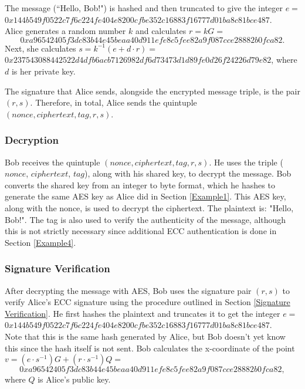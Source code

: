 \documentclass[12pt,a4paper]{article}
\begin{document}
The message (``Hello, Bob!") is hashed and then truncated to give the integer $e =$ \\
{\footnotesize $0x144b549f0522c7f6c224fe404e8200cfbe352c16883f16777d01ba8c81bce487$}. \\
Alice generates a random number $k$ and calculates $r = kG =$ 
\begin{equation} \label{AliceSig}
    0xa96542405f3dc83b44e45beaa40d911efe8c5fee82a9f087cce28882b0fca82.
\end{equation}
Next, she calculates $s = k^{-1}(e + d \cdot r) =$ \\
{\footnotesize $0x237543088442522d4dfb6acb7126982df6d73473d1d89fe0d26f24226d79e82$}, where $d$ is her private key. 

The signature that Alice sends, alongside the encrypted message triple, is the pair $(r,s)$. 
Therefore, in total, Alice sends the quintuple $(nonce, ciphertext, tag, r, s)$. 


\subsubsection{Decryption} \noindent \label{Example3}
Bob receives the quintuple $(nonce, ciphertext, tag, r, s)$. 
He uses the triple ($nonce$, $ciphertext$, $tag$), along with his shared key, to decrypt the message. 
Bob converts the shared key from an integer to byte format, which he hashes to generate the same AES key as Alice did in Section \ref{Example1}. 
This AES key, along with the nonce, is used to decrypt the ciphertext. 
The plaintext is: "Hello, Bob!". 
The tag is also used to verify the authenticity of the message, 
although this is not strictly necessary since additional ECC authentication is done in Section \ref{Example4}. 


\subsubsection{Signature Verification} \noindent \label{Example4}
After decrypting the message with AES, Bob uses the signature pair $(r,s)$ to verify Alice's ECC signature 
using the procedure outlined in Section \ref{Signature Verification}. 
He first hashes the plaintext and truncates it to get the integer $e =$ \\
{\footnotesize$0x144b549f0522c7f6c224fe404e8200cfbe352c16883f16777d01ba8c81bce487$}. \\
Note that this is the same hash generated by Alice, but Bob doesn't yet know this since the hash itself is not sent. 
Bob calculates the x-coordinate of the point $v = (e \cdot s^{-1})G + (r \cdot s^{-1})Q =$ \\
\begin{equation} \label{BobSig}
    0xa96542405f3dc83b44e45beaa40d911efe8c5fee82a9f087cce28882b0fca82,
\end{equation}
where $Q$ is Alice's public key. 
\end{document}
